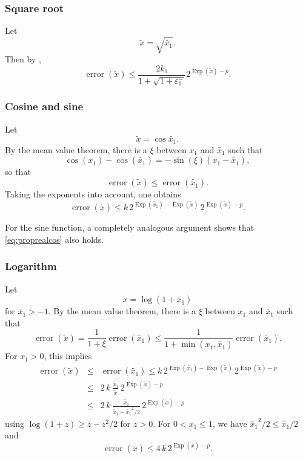 \documentclass [11pt]{article}
\newcommand {\appro}[1]{\widetilde {#1}}
\DeclareMathOperator{\Exp}{\operatorname {Exp}}
\newcommand{\error}{\operatorname {error}}
\renewcommand {\epsilon}{\varepsilon}
\renewcommand {\leq}{\leqslant}
\renewcommand {\geq}{\geqslant}
\begin{document}
\subsubsection {Square root}
\label {sssec:proprealsqrt}

Let
\[
\appro x = \sqrt {\appro {x_1}}.
\]
Then by \cite[\S1.7]{MPFRAlgorithms},
\begin {equation}
\label {eq:proprealsqrt}
\error (\appro x)
\leq
\frac {2 k_1}{1 + \sqrt {1 + \epsilon_1^-}} 2^{\Exp (\appro x) - p}.
\end {equation}


\subsubsection {Cosine and sine}
\label {sssec:proprealcossin}

Let
\[
\appro x = \cos {\appro {x_1}}.
\]
By the mean value theorem, there is a $\xi$ between $x_1$ and $\appro {x_1}$
such that
\[
\cos (x_1) - \cos (\appro {x_1}) = -\sin (\xi) (x_1 - \appro {x_1}),
\]
so that
\[
\error (\appro x)
\leq \error (\appro {x_1}).
\]
Taking the exponents into account, one obtains
\begin {equation}
\label {eq:proprealcos}
\error (\appro x)
\leq
k \, 2^{\Exp (\appro {x_1}) - \Exp (\appro x)}
\, 2^{\Exp (\appro x) - p}.
\end {equation}

For the sine function, a completely analogous argument shows that
\eqref {eq:proprealcos} also holds.


\subsubsection {Logarithm}
\label {sssec:propreallog}

Let
\[
\appro x = \log (1 + \appro {x_1})
\]
for $\appro {x_1} > -1$.
By the mean value theorem, there is a $\xi$ between $x_1$ and $\appro {x_1}$
such that
\[
\error (\appro x) = \frac {1}{1 + \xi} \error (\appro {x_1})
\leq \frac {1}{1 + \min (x_1, \appro {x_1})} \error (\appro {x_1}).
\]
For $x_1 > 0$, this implies
\begin {eqnarray*}
\error (\appro x)
& \leq & \error (\appro {x_1})
\leq
k \, 2^{\Exp (\appro {x_1}) - \Exp (\appro x)}
\, 2^{\Exp (\appro x) - p} \\
& \leq & 2 \, k \, \frac {\appro {x_1}}{\appro x} \, 2^{\Exp (\appro x) - p} \\
& \leq & 2 \, k \, \frac {\appro {x_1}}{\appro {x_1} - \appro {x_1}^2/2}
\, 2^{\Exp (\appro x) - p}
\end {eqnarray*}
using $\log (1 + z) \geq z - z^2/2$ for $z > 0$.
For $0 < x_1 \leq 1$, we have $\appro {x_1}^2/2 \leq \appro {x_1}/2$ and
\[
\error (\appro x)
\leq 4 \, k \, 2^{\Exp (\appro x) - p}.
\]
\end{document}
